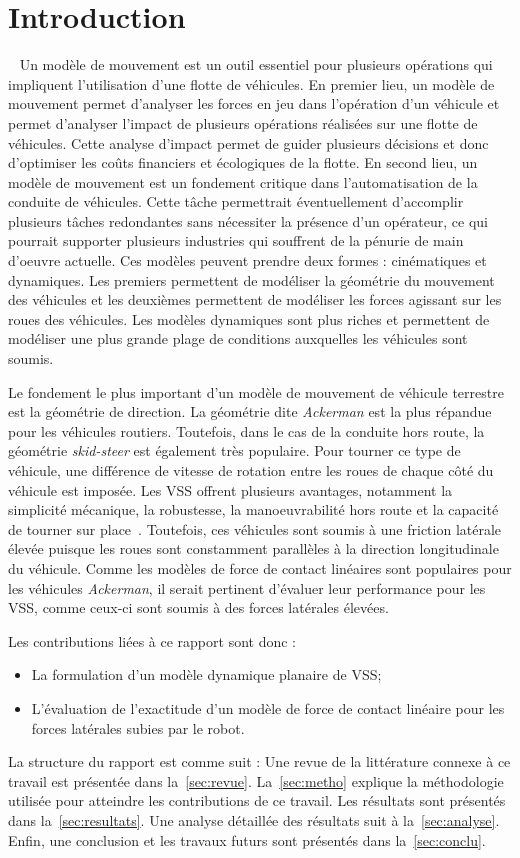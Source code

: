 \section{Introduction}~\label{sec:intro}
Un modèle de mouvement est un outil essentiel pour plusieurs opérations qui impliquent l'utilisation d'une flotte de véhicules.
En premier lieu, un modèle de mouvement permet d'analyser les forces en jeu dans l'opération d'un véhicule et permet d'analyser l'impact de plusieurs opérations réalisées sur une flotte de véhicules.
Cette analyse d'impact permet de guider plusieurs décisions et donc d'optimiser les coûts financiers et écologiques de la flotte.
En second lieu, un modèle de mouvement est un fondement critique dans l'automatisation de la conduite de véhicules. 
Cette tâche permettrait éventuellement d'accomplir plusieurs tâches redondantes sans nécessiter la présence d'un opérateur, ce qui pourrait supporter plusieurs industries qui souffrent de la pénurie de main d'oeuvre actuelle.
Ces modèles peuvent prendre deux formes : cinématiques et dynamiques.
Les premiers permettent de modéliser la géométrie du mouvement des véhicules et les deuxièmes permettent de modéliser les forces agissant sur les roues des véhicules.
Les modèles dynamiques sont plus riches et permettent de modéliser une plus grande plage de conditions auxquelles les véhicules sont soumis. 

Le fondement le plus important d'un modèle de mouvement de véhicule terrestre est la géométrie de direction. 
La géométrie dite \textit{Ackerman} est la plus répandue pour les véhicules routiers.
Toutefois, dans le cas de la conduite hors route, la géométrie \textit{skid-steer} est également très populaire.
Pour tourner ce type de véhicule, une différence de vitesse de rotation entre les roues de chaque côté du véhicule est imposée. 
Les \ac{VSS} offrent plusieurs avantages, notamment la simplicité mécanique, la robustesse, la manoeuvrabilité hors route et la capacité de tourner sur place~\citep{Shamah2001}.
Toutefois, ces véhicules sont soumis à une friction latérale élevée puisque les roues sont constamment parallèles à la direction longitudinale du véhicule. 
Comme les modèles de force de contact linéaires sont populaires pour les véhicules \textit{Ackerman}, il serait pertinent d'évaluer leur performance pour les \ac{VSS}, comme ceux-ci sont soumis à des forces latérales élevées.

Les contributions liées à ce rapport sont donc :
\begin{itemize}
	\item La formulation d'un modèle dynamique planaire de \ac{VSS};
	\item L'évaluation de l'exactitude d'un modèle de force de contact linéaire pour les forces latérales subies par le robot.
\end{itemize}
La structure du rapport est comme suit :
Une revue de la littérature connexe à ce travail est présentée dans la~\autoref{sec:revue}.
La~\autoref{sec:metho} explique la méthodologie utilisée pour atteindre les contributions de ce travail.
Les résultats sont présentés dans la~\autoref{sec:resultats}.
Une analyse détaillée des résultats suit à la~\autoref{sec:analyse}.
Enfin, une conclusion et les travaux futurs sont présentés dans la~\autoref{sec:conclu}.
